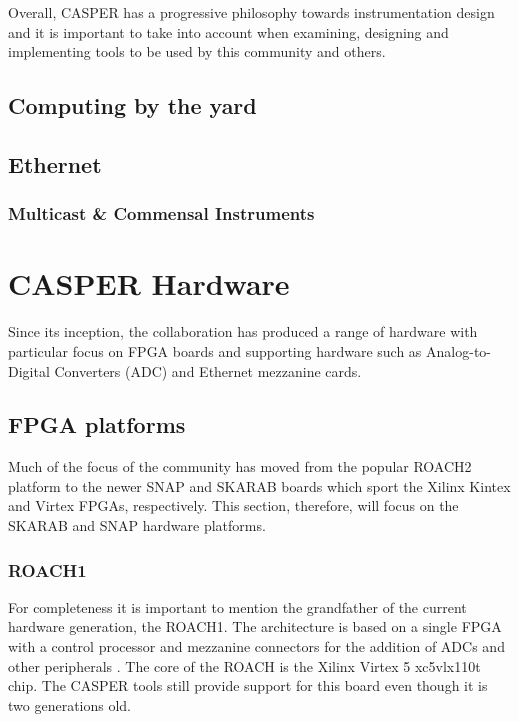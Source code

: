 \documentclass{ws-jai}
\begin{document}
Overall, CASPER has a progressive philosophy towards instrumentation design and it is important to take into account when examining, designing and implementing tools to be used by this community and others.

\subsection{Computing by the yard}

\subsection{Ethernet}

\subsubsection{Multicast \& Commensal Instruments}


\section{CASPER Hardware} \label{sec:Hardware}

Since its inception, the collaboration has produced a range of hardware with particular focus on FPGA boards and supporting hardware such as Analog-to-Digital Converters (ADC) and Ethernet mezzanine cards. 

\subsection{FPGA platforms}

Much of the focus of the community has moved from the popular ROACH2 platform to the newer SNAP and SKARAB boards which sport the Xilinx Kintex and Virtex FPGAs, respectively. This section, therefore, will focus on the SKARAB and SNAP hardware platforms.

\subsubsection{ROACH1}

For completeness it is important to mention the grandfather of the current hardware generation, the ROACH1. The architecture is based on a single FPGA with a control processor and mezzanine connectors for the addition of ADCs and other peripherals \cite{Casp09}. The core of the ROACH is the Xilinx Virtex 5 xc5vlx110t chip. The CASPER tools still provide support for this board even though it is two generations old.
\end{document}
